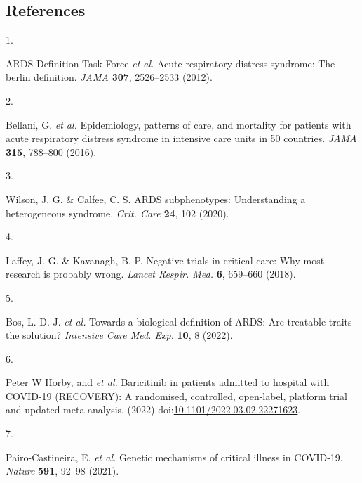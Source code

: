 \documentclass[
  11,
  a4paper,
]{article}
\newlength{\cslhangindent}
\newlength{\csllabelwidth}
\newlength{\cslentryspacingunit} %
\newenvironment{CSLReferences}[2] %
 {%
  \setlength{\parindent}{0pt}
  \ifodd #1
  \let\oldpar\par
  \def\par{\hangindent=\cslhangindent\oldpar}
  \fi
  \setlength{\parskip}{#2\cslentryspacingunit}
 }%
 {}
\newcommand{\CSLLeftMargin}[1]{\parbox[t]{\csllabelwidth}{#1}}
\newcommand{\CSLRightInline}[1]{\parbox[t]{\linewidth - \csllabelwidth}{#1}\break}
\begin{document}
\newpage

\hypertarget{references}{%
\subsection{References}\label{references}}

\hypertarget{refs}{}
\begin{CSLReferences}{0}{0}
\leavevmode{}%
\CSLLeftMargin{1. }%
\CSLRightInline{ARDS Definition Task Force \emph{et al.} Acute
respiratory distress syndrome: The berlin definition. \emph{JAMA}
\textbf{307}, 2526--2533 (2012).}

\leavevmode{}%
\CSLLeftMargin{2. }%
\CSLRightInline{Bellani, G. \emph{et al.} Epidemiology, patterns of
care, and mortality for patients with acute respiratory distress
syndrome in intensive care units in 50 countries. \emph{JAMA}
\textbf{315}, 788--800 (2016).}

\leavevmode{}%
\CSLLeftMargin{3. }%
\CSLRightInline{Wilson, J. G. \& Calfee, C. S. {ARDS} subphenotypes:
Understanding a heterogeneous syndrome. \emph{Crit. Care} \textbf{24},
102 (2020).}

\leavevmode{}%
\CSLLeftMargin{4. }%
\CSLRightInline{Laffey, J. G. \& Kavanagh, B. P. Negative trials in
critical care: Why most research is probably wrong. \emph{Lancet Respir.
Med.} \textbf{6}, 659--660 (2018).}

\leavevmode{}%
\CSLLeftMargin{5. }%
\CSLRightInline{Bos, L. D. J. \emph{et al.} Towards a biological
definition of {ARDS}: Are treatable traits the solution? \emph{Intensive
Care Med. Exp.} \textbf{10}, 8 (2022).}

\leavevmode{}%
\CSLLeftMargin{6. }%
\CSLRightInline{Peter W Horby, and \emph{et al.} Baricitinib in patients
admitted to hospital with {COVID}-19 ({RECOVERY}): A randomised,
controlled, open-label, platform trial and updated meta-analysis. (2022)
doi:\href{https://doi.org/10.1101/2022.03.02.22271623}{10.1101/2022.03.02.22271623}.}

\leavevmode{}%
\CSLLeftMargin{7. }%
\CSLRightInline{Pairo-Castineira, E. \emph{et al.} Genetic mechanisms of
critical illness in {COVID-19}. \emph{Nature} \textbf{591}, 92--98
(2021).}


\end{CSLReferences}
\end{document}
